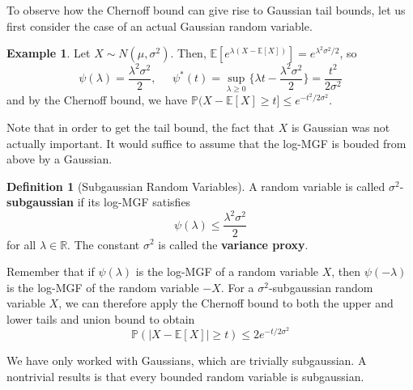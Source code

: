 \documentclass{article}
\theoremstyle{definition}
\newtheorem{example}{Example}[section]
\theoremstyle{remark}
\theoremstyle{definition}
\newtheorem{definition}{Definition}[section]
\begin{document}
To observe how the Chernoff bound can give rise to Gaussian tail bounds, let us first consider the case of an actual Gaussian random variable. 

\begin{example}
Let $X \sim N(\mu, \sigma^2)$. Then, $\mathbb{E}[ e^{\lambda (X - \mathbb{E}[X])} ] = e^{\lambda^2 \sigma^2 / 2}$, so 
\[\psi(\lambda) = \frac{\lambda^2 \sigma^2}{2}, \;\;\;\;\; \psi^* (t) = \sup_{\lambda \geq 0} \big\{ \lambda t - \frac{\lambda^2 \sigma^2}{2} \big\} = \frac{t^2}{2 \sigma^2}\]
and by the Chernoff bound, we have $\mathbb{P}(X - \mathbb{E}[X] \geq t ] \leq e^{-t^2 / 2\sigma^2}$. 
\end{example}

Note that in order to get the tail bound, the fact that $X$ is Gaussian was not actually important. It would suffice to assume that the log-MGF is bouded from above by a Gaussian. 

\begin{definition}[Subgaussian Random Variables]
A random variable is called $\sigma^2$-\textbf{subgaussian} if its log-MGF satisfies 
\[\psi(\lambda) \leq \frac{\lambda^2 \sigma^2}{2}\]
for all $\lambda \in \mathbb{R}$. The constant $\sigma^2$ is called the \textbf{variance proxy}. 
\end{definition}

Remember that if $\psi(\lambda)$ is the log-MGF of a random variable $X$, then $\psi(-\lambda)$ is the log-MGF of the random variable $-X$. For a $\sigma^2$-subgaussian random variable $X$, we can therefore apply the Chernoff bound to both the upper and lower tails and union bound to obtain 
\[\mathbb{P}(|X - \mathbb{E}[X]| \geq t ) \leq 2 e^{-t/2\sigma^2}\]

We have only worked with Gaussians, which are trivially subgaussian. A nontrivial results is that every bounded random variable is subgaussian. 
\end{document}
